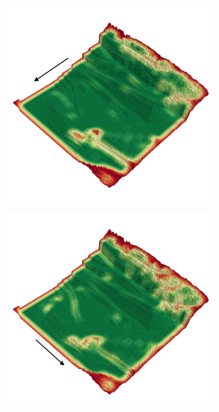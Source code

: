 \documentclass[../document.tex]{subfiles}
\begin{document}
\begin{figure} [htbp]
\begin{subfigure}[b]{0.45\textwidth}
    \includegraphics[width=\linewidth]{../img/4/traversability/quarry/-90.png}
\end{subfigure}
\begin{subfigure}[b]{0.45\textwidth}
  \includegraphics[width=\linewidth]{../img/4/traversability/quarry/-0.png}

\end{subfigure}
\end{figure}
\end{document}
